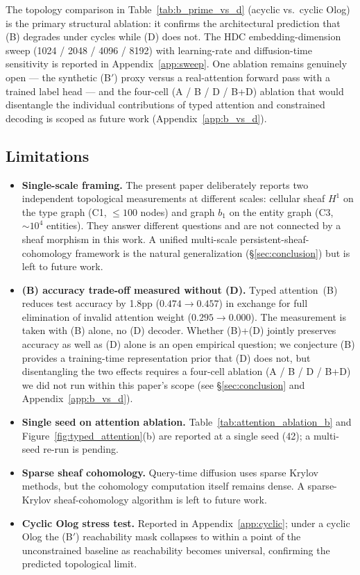The topology comparison in Table~\ref{tab:b_prime_vs_d} (acyclic vs.\
cyclic Olog) is the primary structural ablation: it confirms the
architectural prediction that (B) degrades under cycles while (D) does
not. The HDC embedding-dimension sweep (1024 / 2048 / 4096 / 8192) with
learning-rate and diffusion-time sensitivity is reported in
Appendix~\ref{app:sweep}. One ablation remains genuinely open --- the
synthetic (B$'$) proxy versus a real-attention forward pass with a
trained label head --- and the four-cell (A / B / D / B+D) ablation that
would disentangle the individual contributions of typed attention and
constrained decoding is scoped as future work (Appendix~\ref{app:b_vs_d}).

\subsection{Limitations}
\begin{itemize}
\item \textbf{Single-scale framing.} The present paper deliberately reports
two independent topological measurements at different scales: cellular
sheaf $H^1$ on the type graph (C1, $\leq 100$ nodes) and graph $b_1$ on
the entity graph (C3, $\sim 10^4$ entities). They answer different
questions and are not connected by a sheaf morphism in this work. A
unified multi-scale persistent-sheaf-cohomology framework is the natural
generalization (\S\ref{sec:conclusion}) but is left to future work.
\item \textbf{(B) accuracy trade-off measured without (D).}
Typed attention~(B) reduces test accuracy by 1.8pp ($0.474 \to 0.457$)
in exchange for full elimination of invalid attention weight
($0.295 \to 0.000$). The measurement is taken with (B) alone, no (D)
decoder. Whether (B)+(D) jointly preserves accuracy as well as (D)
alone is an open empirical question; we conjecture (B) provides a
training-time representation prior that (D) does not, but disentangling
the two effects requires a four-cell ablation (A / B / D / B+D) we did
not run within this paper's scope (see \S\ref{sec:conclusion} and
Appendix~\ref{app:b_vs_d}).
\item \textbf{Single seed on attention ablation.} Table~\ref{tab:attention_ablation_b}
and Figure~\ref{fig:typed_attention}(b) are reported at a single seed
(42); a multi-seed re-run is pending.
\item \textbf{Sparse sheaf cohomology.} Query-time diffusion uses sparse
Krylov methods, but the cohomology computation itself remains dense.
A sparse-Krylov sheaf-cohomology algorithm is left to future work.
\item \textbf{Cyclic Olog stress test.} Reported in Appendix~\ref{app:cyclic};
under a cyclic Olog the (B$'$) reachability mask collapses to within a
point of the unconstrained baseline as reachability becomes universal,
confirming the predicted topological limit.
\end{itemize}
